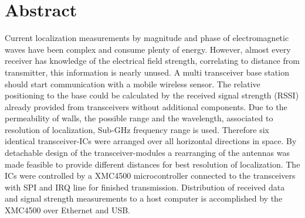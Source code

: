 \newpage
\chapter*{Abstract}
\label{sec:abstract}
\pagestyle{scrheadings}

Current localization measurements by magnitude and phase of electromagnetic waves have been complex and consume plenty of energy. However, almost every receiver has knowledge of the electrical field strength, correlating to distance from transmitter, this information is nearly unused. A multi transceiver base station should start communication with a mobile wireless sensor. The relative positioning to the base could be calculated by the received signal strength (RSSI) already provided from transceivers without additional components. Due to the permeability of walls, the possible range and the wavelength, associated to resolution of localization,   Sub-GHz frequency range is used.  Therefore six identical transceiver-ICs were arranged over all horizontal directions in space. By detachable design of the transceiver-modules a rearranging of the antennas was made feasible to provide different distances for best resolution of localization. The ICs were controlled by a XMC4500 microcontroller connected to the transceivers with SPI and IRQ line for finished transmission. Distribution of received data and signal strength measurements to a host computer is accomplished by the XMC4500 over Ethernet and USB.